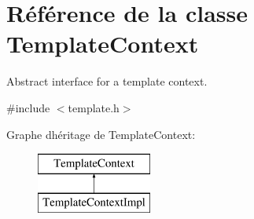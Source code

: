 \hypertarget{class_template_context}{}\section{Référence de la classe Template\+Context}
\label{class_template_context}


Abstract interface for a template context.  




{\ttfamily \#include $<$template.\+h$>$}

Graphe d\textquotesingle{}héritage de Template\+Context\+:\begin{figure}[H]
\begin{center}
\leavevmode
\includegraphics[height=2.000000cm]{class_template_context}
\end{center}
\end{figure}
